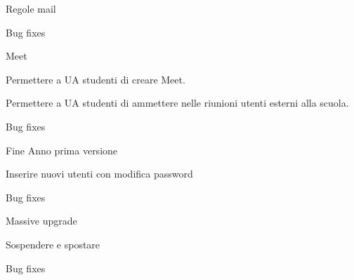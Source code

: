 \begin{changelog}[author=JOHN DOE, sectioncmd=\chapter*]
	\begin{version}[v=1.0.3,
		date=2023-07-25]
		\added
		\item Regole mail
		\fixed
		\item Bug fixes
	\end{version}
		\begin{version}[v=1.0.2,
		date=2023-07-21]
		\added
		\item Meet
		\item Permettere a  UA studenti di creare Meet.
		\item Permettere a UA studenti di ammettere nelle riunioni utenti esterni alla scuola.
		\fixed
		\item Bug fixes
	\end{version}
	\begin{version}[v=1.0.1,
		date=2023-07-17]
		\added
		\item Fine Anno prima versione
		\item Inserire nuovi utenti con modifica password
		\fixed
		\item Bug fixes
	\end{version}
	\begin{version}[v=1.0.0,
		date=2023-07-15]
		\added
		\item Massive upgrade
		\item Sospendere e spostare
		\fixed
		\item Bug fixes
	\end{version}
	\end{changelog}
	\listoftodos